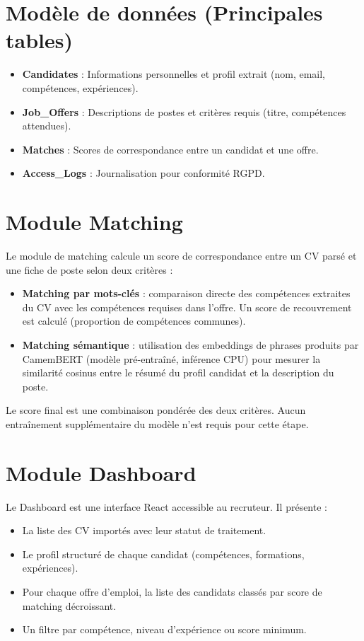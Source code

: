 \documentclass[12pt,a4paper]{report}
\begin{document}
\section{Modèle de données (Principales tables)}
\begin{itemize}
    \item \textbf{Candidates} : Informations personnelles et profil extrait (nom, email, compétences, expériences).
    \item \textbf{Job\_Offers} : Descriptions de postes et critères requis (titre, compétences attendues).
    \item \textbf{Matches} : Scores de correspondance entre un candidat et une offre.
    \item \textbf{Access\_Logs} : Journalisation pour conformité RGPD.
\end{itemize}

\section{Module Matching}

Le module de matching calcule un score de correspondance entre un CV parsé et une fiche de poste selon deux critères :

\begin{itemize}
    \item \textbf{Matching par mots-clés} : comparaison directe des compétences extraites du CV avec les compétences requises dans l'offre. Un score de recouvrement est calculé (proportion de compétences communes).
    \item \textbf{Matching sémantique} : utilisation des embeddings de phrases produits par CamemBERT (modèle pré-entraîné, inférence CPU) pour mesurer la similarité cosinus entre le résumé du profil candidat et la description du poste.
\end{itemize}

Le score final est une combinaison pondérée des deux critères. Aucun entraînement supplémentaire du modèle n'est requis pour cette étape.

\section{Module Dashboard}

Le Dashboard est une interface React accessible au recruteur. Il présente :
\begin{itemize}
    \item La liste des CV importés avec leur statut de traitement.
    \item Le profil structuré de chaque candidat (compétences, formations, expériences).
    \item Pour chaque offre d'emploi, la liste des candidats classés par score de matching décroissant.
    \item Un filtre par compétence, niveau d'expérience ou score minimum.
\end{itemize}
\end{document}
